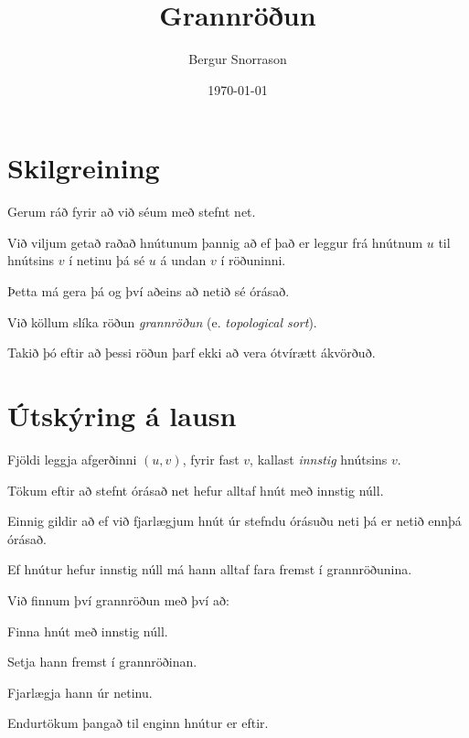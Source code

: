 \title{Grannröðun}
\author{Bergur Snorrason}
\date{\today}



\frame{\titlepage}

\section{Skilgreining}
{
	{
		\item<1-> Gerum ráð fyrir að við séum með stefnt net.
		\item<2-> Við viljum getað raðað hnútunum þannig að ef það er leggur frá hnútnum $u$ til hnútsins $v$ í netinu þá sé $u$ á undan $v$ í röðuninni.
		\item<3-> Þetta má gera þá og því aðeins að netið sé órásað.
		\item<4-> Við köllum slíka röðun \emph{grannröðun} (e. \emph{topological sort}).
		\item<5-> Takið þó eftir að þessi röðun þarf ekki að vera ótvírætt ákvörðuð.
	}
}

\section{Útskýring á lausn}
{
	{
		\item<1-> Fjöldi leggja afgerðinni $(u, v)$, fyrir fast $v$, kallast \emph{innstig} hnútsins $v$.
		\item<2-> Tökum eftir að stefnt órásað net hefur alltaf hnút með innstig núll.
		\item<3-> Einnig gildir að ef við fjarlægjum hnút úr stefndu órásuðu neti þá er netið ennþá órásað.
		\item<4-> Ef hnútur hefur innstig núll má hann alltaf fara fremst í grannröðunina.
		\item<5-> Við finnum því grannröðun með því að:
		{
			\item<6-> Finna hnút með innstig núll.
			\item<7-> Setja hann fremst í grannröðinan.
			\item<8-> Fjarlægja hann úr netinu.
			\item<9-> Endurtökum þangað til enginn hnútur er eftir.
		}
	}
}

